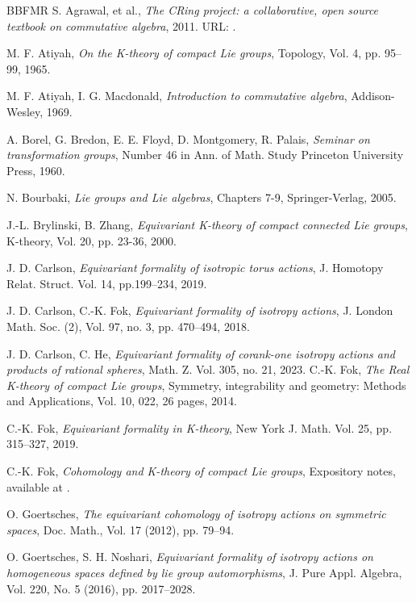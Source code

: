\documentclass[11pt]{amsart}
\theoremstyle{plain}
\theoremstyle{definition}
\begin{document}
\begin{thebibliography}{BBFMR}
	S. Agrawal, et al., 
	\emph{The CRing project: a collaborative, open source textbook on commutative algebra}, 2011. URL: .
	
	M. F. Atiyah, 
	\emph{On the K-theory of compact Lie groups}, 
	Topology, Vol. 4, pp. 95--99, 1965.
	
	M. F. Atiyah, I. G. Macdonald, 
	\emph{Introduction to commutative algebra}, 
	Addison-Wesley, 1969.
	
	A. Borel, G. Bredon, E. E. Floyd, D. Montgomery, R. Palais, 
	\emph{Seminar on transformation groups}, Number 46 in Ann. of Math. Study Princeton University Press, 1960.	
	
	N. Bourbaki, \emph{Lie groups and Lie algebras}, Chapters 7-9, Springer-Verlag, 2005.	
	
	J.-L. Brylinski, B. Zhang, 
	\emph{Equivariant K-theory of compact connected Lie groups}, 
	K-theory, Vol. 20, pp. 23-36, 2000.
	
	J. D. Carlson, 
	\emph{Equivariant formality of isotropic torus actions}, 
	J. Homotopy Relat. Struct. Vol. 14, pp.199--234, 2019. 
	
	J. D. Carlson, C.-K. Fok,  
	\emph{Equivariant formality of isotropy actions}, 
	J. London Math. Soc. (2), Vol. 97, no. 3, pp. 470--494, 2018.
	
	J. D. Carlson, C. He, 
	\emph{Equivariant formality of corank-one isotropy actions and products of rational spheres}, 
	Math. Z. Vol. 305, no. 21, 2023.
	C.-K. Fok, 
	\emph{The Real K-theory of compact Lie groups}, 
	Symmetry, integrability and geometry: Methods and Applications, Vol. 10, 022, 26 pages, 2014.
	
C.-K. Fok, \emph{Equivariant formality in K-theory}, 
New York J. Math. Vol. 25, pp. 315--327, 2019.

	C.-K. Fok, \emph{Cohomology and K-theory of compact Lie groups}, 
	Expository notes, available at .
	
	O. Goertsches, \textit{The equivariant cohomology of isotropy actions on symmetric spaces}, Doc. Math., Vol. 17 (2012), pp. 79--94.
	
	O. Goertsches, S. H. Noshari, \textit{Equivariant formality of isotropy actions on homogeneous spaces defined by lie group automorphisms}, 
	J. Pure Appl. Algebra, Vol. 220, No. 5 (2016), pp. 2017--2028. 


\end{thebibliography}
\end{document}
